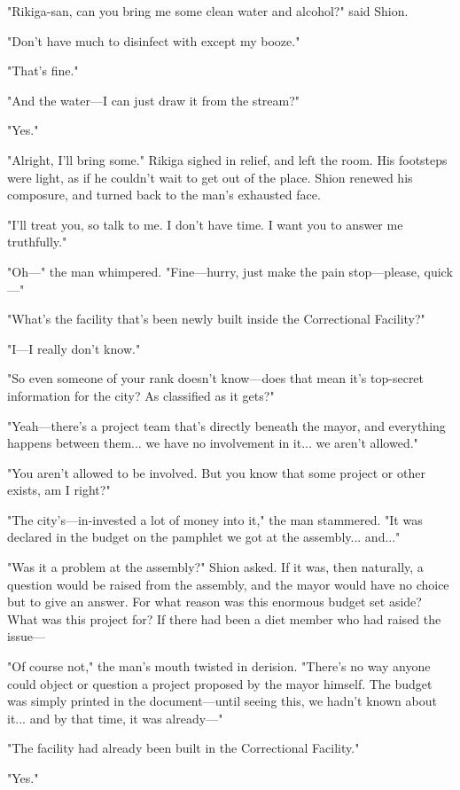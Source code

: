 "Rikiga-san, can you bring me some clean water and alcohol?" said Shion.

"Don't have much to disinfect with except my booze."

"That's fine."

"And the water---I can just draw it from the stream?"

"Yes."

"Alright, I'll bring some." Rikiga sighed in relief, and left the room.
His footsteps were light, as if he couldn't wait to get out of the
place. Shion renewed his composure, and turned back to the man's
exhausted face.

"I'll treat you, so talk to me. I don't have time. I want you to answer
me truthfully."

"Oh---" the man whimpered. "Fine---hurry, just make the pain stop---please,
quick---"

"What's the facility that's been newly built inside the Correctional
Facility?"

"I---I really don't know."

"So even someone of your rank doesn't know---does that mean it's
top-secret information for the city? As classified as it gets?"

"Yeah---there's a project team that's directly beneath the mayor, and
everything happens between them... we have no involvement in it... we
aren't allowed."

"You aren't allowed to be involved. But you know that some project or
other exists, am I right?"

"The city's---in-invested a lot of money into it," the man stammered. "It
was declared in the budget on the pamphlet we got at the assembly...
and..."

"Was it a problem at the assembly?" Shion asked. If it was, then
naturally, a question would be raised from the assembly, and the mayor
would have no choice but to give an answer. For what reason was this
enormous budget set aside? What was this project for? If there had been
a diet member who had raised the issue---

"Of course not," the man's mouth twisted in derision. "There's no way
anyone could object or question a project proposed by the mayor himself.
The budget was simply printed in the document---until seeing this, we
hadn't known about it... and by that time, it was already---"

"The facility had already been built in the Correctional Facility."

"Yes."

